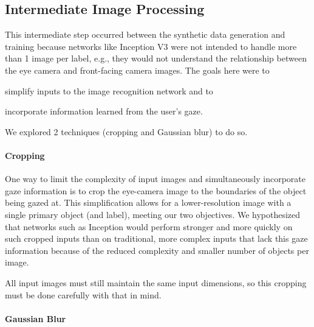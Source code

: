 \subsection{Intermediate Image Processing}

This intermediate step occurred between the synthetic data generation and training
because networks like Inception V3 were not intended to handle more than 1 image
per label, e.g., they would not understand the relationship between the eye
camera and front-facing camera images. The goals here were to
\begin{inlist}
\item simplify inputs to the image recognition network and to
\item incorporate information learned from the user's gaze.
\end{inlist}
We explored 2 techniques (cropping and Gaussian blur) to do so.

\paragraph{Cropping}

One way to limit the complexity of input images and simultaneously incorporate
gaze information is to crop the eye-camera image to the boundaries of the object
being gazed at. This simplification allows for a lower-resolution image with a
single primary object (and label), meeting our two objectives. We hypothesized
that networks such as Inception would perform stronger and more quickly on such
cropped inputs than on traditional, more complex inputs that lack this gaze
information because of the reduced complexity and smaller number of objects per
image.

All input images must still maintain the same input dimensions, so this cropping
must be done carefully with that in mind.


\paragraph{Gaussian Blur}

